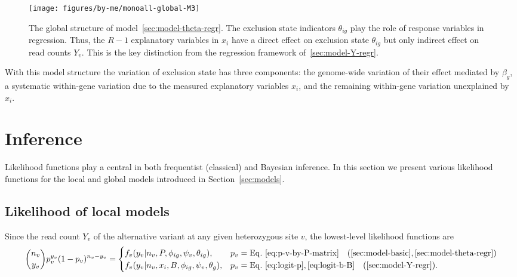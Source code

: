 \documentclass[letterpaper]{article}
\begin{document}
\begin{figure}[t]
\begin{center}
\texttt{[image: figures/by-me/monoall-global-M3]}
\end{center}
\caption{
The global structure of model~\ref{sec:model-theta-regr}.  The exclusion state
indicators \(\theta_{ig}\) play the role of response variables in regression.
Thus, the \(R-1\) explanatory variables in \(x_i\) have a direct effect on
exclusion state \(\theta_{ig}\) but only indirect effect on read counts
\(Y_v\).  This is the key distinction from the regression framework
of~\ref{sec:model-Y-regr}.
}
\label{fig:theta-regression}
\end{figure}

With this model structure the variation of exclusion state has three
components: the genome-wide variation of their effect mediated by \(\beta_g\),
a systematic within-gene variation due to the measured explanatory variables
\(x_i\), and the remaining within-gene variation unexplained by \(x_i\).

\renewcommand{\thesubsection}{\arabic{section}.\arabic{subsection}}
\section{Inference}
\label{sec:likelihood}

Likelihood functions play a central in both frequentist (classical) and
Bayesian inference.  In this section we present various likelihood functions
for the local and global models introduced in Section~\ref{sec:models}.

\subsection{Likelihood of local models}
\label{sec:likelihood-local}

Since the read count \(Y_v\) of the alternative variant at any given
heterozygous site \(v\), the lowest-level likelihood functions are
\begin{equation}
\label{eq:f-v-M1-M3}
\binom{n_v}{y_v} p_v^{y_v} (1-p_v)^{n_v-y_v}
=
\begin{cases}
f_v(y_v | n_v, P, \phi_{ig}, \psi_v, \theta_{ig}), & p_v =
\mathrm{Eq.~}\ref{eq:p-v-by-P-matrix}
\quad (\ref{sec:model-basic}, \ref{sec:model-theta-regr}) \\
f_v(y_v | n_v, x_i, B, \phi_{ig}, \psi_v, \theta_{g}), & p_v =
\mathrm{Eq.~}\ref{eq:logit-p},\ref{eq:logit-b-B}
\quad (\ref{sec:model-Y-regr}).
\end{cases}
\end{equation}
\end{document}
